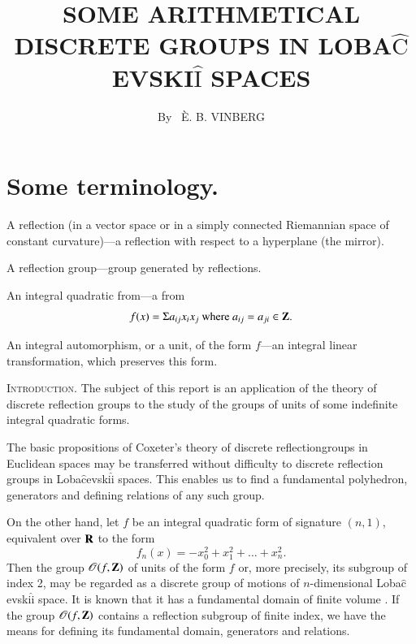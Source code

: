 
\title{SOME ARITHMETICAL DISCRETE GROUPS IN LOBA$\hat{\text{C}}$EVSKI$\hat{\text{I}}$ SPACES}

\author{By~ \`E. B. VINBERG}

\date{}
\maketitle


\setcounter{pageoriginal}{322}
\section*{Some terminology.}\pageoriginale 

A reflection (in a vector space or in a simply connected Riemannian space of constant curvature)---a reflection with respect to a hyperplane (the mirror).

A reflection group---group generated by reflections. 

An integral quadratic from---a from 
$$
f(x) = \Sigma a_{ij} x_i x_j \text{ where } a_{ij} = a_{ji} \in \mathbf{Z}.
$$

An integral automorphism, or a unit, of the form $f$---an integral linear transformation, which preserves this form.

\textsc{Introduction.} The subject of this report is an application of the theory of discrete reflection groups to the study of the groups of units of some indefinite integral quadratic forms.

The basic propositions of Coxeter's theory of discrete reflection\break groups in Euclidean spaces \cite{art10-key1} may be transferred without difficulty to discrete reflection groups in Loba$\hat{\text{c}}$evski$\hat{\text{i}}$ spaces. This enables us to find a fundamental polyhedron, generators and defining relations of any such group.

On the other hand, let $f$ be an integral quadratic form of signature $(n,1)$, \ie equivalent over $\mathbf{R}$ to the form 
$$
f_n (x) = - x^2_0 + x^2_1 + \ldots + x^2_n.
$$
Then the group $\mathscr{O}(f, \mathbf{Z})$ of units of the form $f$ or, more precisely, its subgroup of index 2, may be regarded as a discrete group of motions of $n$-dimensional
Loba$\hat{\text{c}}$evski$\hat{\text{i}}$ space. It is known that it has a fundamental domain of finite volume \cite{art10-key2}. If the group $\mathscr{O}(f, \mathbf{Z})$ contains a reflection subgroup of finite index, we have the means for defining its fundamental domain, generators and relations.

